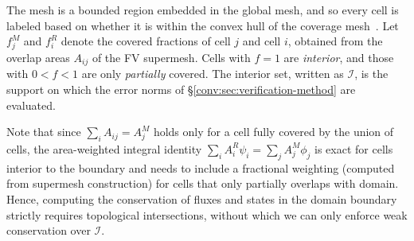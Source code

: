 The \ROMS mesh is a bounded region embedded in the global \MPAS mesh, and so every \ROMS cell is labeled based on whether it is within the convex hull of the \MPAS coverage mesh~\citep{mahadevan2020coupling}. Let $f^M_j$ and $f^R_i$ denote the covered fractions of \MPAS cell $j$ and \ROMS cell $i$, obtained from the overlap areas $A_{ij}$ of the FV supermesh. Cells with $f=1$ are \emph{interior}, and those with $0<f<1$ are only \emph{partially} covered. The interior set, written as $\mathcal{I}$, is the support on which the error norms of \S\ref{conv:sec:verification-method} are evaluated. 



Note that since
$\sum_i A_{ij} = A^M_j$ holds only for a \MPAS cell fully covered by the
union of \ROMS cells, the area-weighted integral identity
$\sum_i A^R_i \psi_i = \sum_j A^M_j \phi_j$ is exact for \MPAS cells
interior to the \ROMS boundary and needs to include a fractional weighting (computed from supermesh construction) for \MPAS cells that only partially overlaps with \ROMS domain. Hence, computing the conservation of fluxes and states in the \ROMS domain boundary strictly requires topological intersections, without which we
can only enforce weak conservation over $\mathcal{I}$. 

